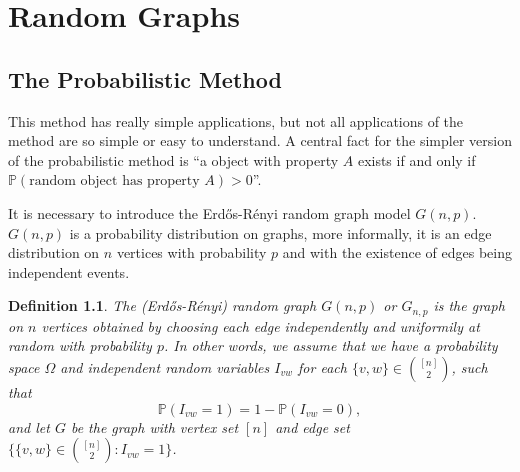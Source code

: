 \documentclass[12pt,twoside,a4paper,bibliography=totocnumbered]{book}
\numberwithin{equation}{section}
\newtheorem{theorem}             {Theorem}[section]
\newtheorem{definition}	[theorem] {Definition}
\theoremstyle{remark}
\begin{document}







\chapter{Random Graphs}
\section{The Probabilistic Method}
This method has really simple applications, but not all applications of the method are so simple or easy to understand. A central fact for the simpler version of the probabilistic method is ``a object with property $ A$ exists if and only if $\mathbb{P}(\text{random object has property }A)>0$''.

It is necessary to introduce the Erd\H{o}s-Rényi random graph model $G(n,p)$. $G(n,p)$ is a probability distribution on graphs, more informally, it is an edge distribution on $n$ vertices with probability $p$ and with the existence of edges being independent events.

\begin{definition}\label{def:randomgraph}
The (Erd\H{o}s-Rényi) random graph $G(n,p)$ or $G_{n,p}$ is the graph on $n$ vertices obtained by choosing each edge independently and uniformily at random with probability $p$. In other words, we assume that we have a probability space $\Omega$ and independent random variables $I_{vw}$ for each $\{v,w\} \in \binom{[n]}{2}$, such that
$$\mathbb{P}(I_{vw} = 1) = 1 - \mathbb{P}(I_{vw} = 0),$$ 
and let $G$ be the graph with vertex set $[n]$ and edge set $\{\{v,w\} \in \binom{[n]}{2}\colon I_{vw} = 1\}$. 

\end{definition}
\end{document}
